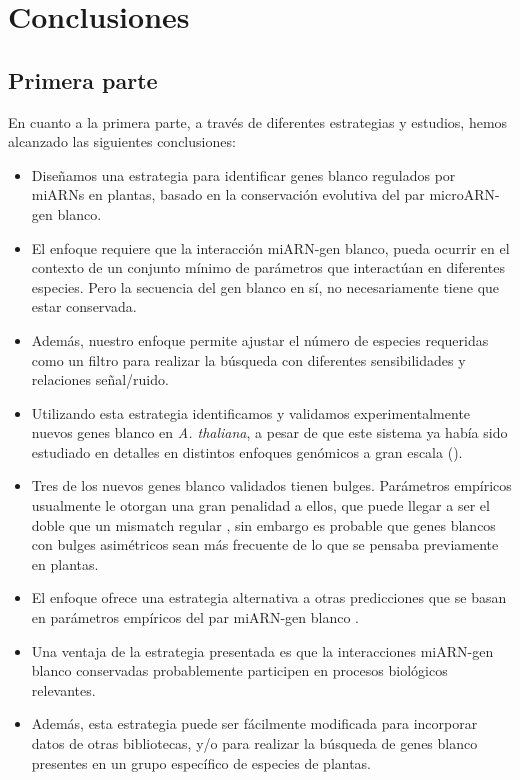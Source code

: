 
\chapter{Conclusiones}

\graphicspath{{Chapter2/Figs/}}


\section[Short title]{Primera parte}

En cuanto a la primera parte, a través de diferentes estrategias y estudios, hemos alcanzado las siguientes conclusiones:

\begin{itemize}
    \item Diseñamos una estrategia para identificar genes blanco regulados por miARNs en plantas, basado en la conservación evolutiva del par microARN-gen blanco.
    \item El enfoque requiere que la interacción miARN-gen blanco, pueda ocurrir en el contexto de un conjunto mínimo de parámetros que interactúan en diferentes especies. Pero la secuencia del gen blanco en sí, no necesariamente tiene que estar conservada.
    \item Además, nuestro enfoque permite ajustar el número de especies requeridas como un filtro para realizar la búsqueda con diferentes sensibilidades y relaciones señal/ruido.
    \item Utilizando esta estrategia identificamos y validamos experimentalmente nuevos genes blanco en \textit{A. thaliana}, a pesar de que este sistema ya había sido estudiado en detalles en distintos enfoques genómicos a gran escala (\citep{Allen2005207,JonesRhoades2004787,Addo-quaye2009a,German2008,Rajagopalan2006,Schwab2005517}).
    \item Tres de los nuevos genes blanco validados tienen bulges. Parámetros empíricos usualmente le otorgan una gran penalidad a ellos, que puede llegar a ser el doble que un mismatch regular \citep{JonesRhoades2004787}, 
    sin embargo es probable que genes blancos con bulges asimétricos sean más frecuente de lo que se pensaba previamente en plantas.
    \item El enfoque ofrece una estrategia alternativa a otras predicciones que se basan en parámetros empíricos del par miARN-gen blanco \citep{Allen2005207,JonesRhoades2004787,citeulike:8816489,Fahlgren_chapter}.
    \item Una ventaja de la estrategia presentada es que la interacciones miARN-gen blanco conservadas probablemente participen en procesos biológicos relevantes.
    \item Además, esta estrategia puede ser fácilmente modificada para incorporar datos de otras bibliotecas, y/o para realizar la búsqueda de genes blanco presentes en un grupo específico de especies de plantas.
\end{itemize}


